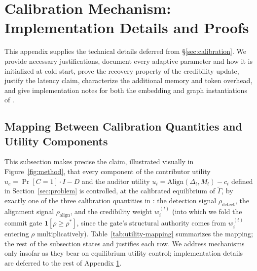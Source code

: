 \section{Calibration Mechanism: Implementation Details and Proofs}
\label{app:calibration_details}

This appendix supplies the technical details deferred from
\S\ref{sec:calibration}. We provide necessary justifications, document every adaptive parameter and how
it is initialized at cold start, prove the recovery property of the
credibility update, justify the latency claim, characterize the
additional memory and token overhead, and give implementation notes
for both the embedding and graph instantiations of \system.
\subsection{Mapping Between Calibration Quantities and Utility Components}
\label{app:utility-mapping}

This subsection makes precise the claim, illustrated visually in
Figure~\ref{fig:method}, that every component of the contributor utility
$u_c = \Pr[C{=}1]\cdot I - D$ and the auditor utility
$u_i = \mathrm{Align}(\Delta_t,M_t) - c_i$ defined in
Section~\ref{sec:problem} is controlled, at the calibrated equilibrium of
$\widetilde\Gamma$, by exactly one of the three calibration quantities in
\system: the detection signal $\rho_{\text{detect}}$, the alignment
signal $\rho_{\text{align}}$, and the credibility weight $w_i^{(t)}$
(into which we fold the commit gate $\mathbf{1}[\rho \geq \rho^*]$, since
the gate's structural authority comes from $w_i^{(t)}$ entering $\rho$
multiplicatively). Table~\ref{tab:utility-mapping} summarizes the mapping;
the rest of the subsection states and justifies each row. We address
mechanisms only insofar as they bear on equilibrium utility control;
implementation details are deferred to the rest of Appendix \ref{app:calibration_details}.

